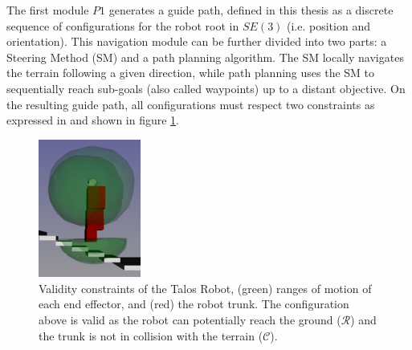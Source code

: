 The first module $P1$ generates a guide path, defined in this thesis as a discrete sequence of configurations for the robot root in $SE(3)$ (i.e. position and orientation).
This navigation module can be further divided into two parts: a Steering Method (SM) and a path planning algorithm.
The SM locally navigates the terrain following a given direction, while path planning uses the SM to sequentially reach sub-goals (also called waypoints) up to a distant objective. 
On the resulting guide path, all configurations must respect two constraints as expressed in \cite{RB-PRM} and shown in figure \ref{fig:ROMs}.

\begin{figure}
    \centering
    \includegraphics[width=0.3\textwidth]{Figures/Chapter_LEAS/ROMs.png}
    \caption{Validity constraints of the Talos Robot, (green) ranges of motion of each end effector, and (red) the robot trunk. The configuration above is valid as the robot can potentially reach the ground ($\mathcal{R}$) and the trunk is not in collision with the terrain ($\mathcal{C}$).}
    \label{fig:ROMs}
\end{figure}

